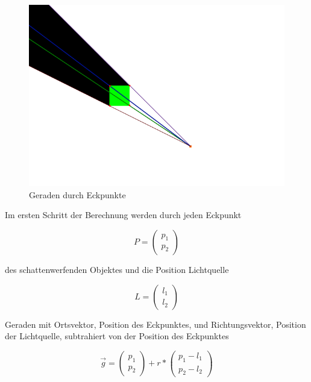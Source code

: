 \begin{figure}[t]
	\centering
	\includegraphics[width=\columnwidth]{images/durchfuehrung_1.png}
	\caption{Geraden durch Eckpunkte}
	\label{fig:durch2}
\end{figure}

Im ersten Schritt der Berechnung werden durch jeden Eckpunkt

\begin{equation}
	P = \left(\begin{array}{c} p_1 \\ p_2 \end{array}\right)
\end{equation}

des schattenwerfenden Objektes und die Position Lichtquelle

\begin{equation}
	L = \left(\begin{array}{c} l_1 \\ l_2 \end{array}\right)
\end{equation}

Geraden mit Ortsvektor, Position des Eckpunktes, und Richtungsvektor, Position der Lichtquelle, subtrahiert von der Position des Eckpunktes

\begin{equation}
	\vec{g} = \left(\begin{array}{c} p_1 \\ p_2 \end{array}\right) + r * \left(\begin{array}{c} p_1 - l_1 \\ p_2 - l_2 \end{array}\right)
\end{equation}

